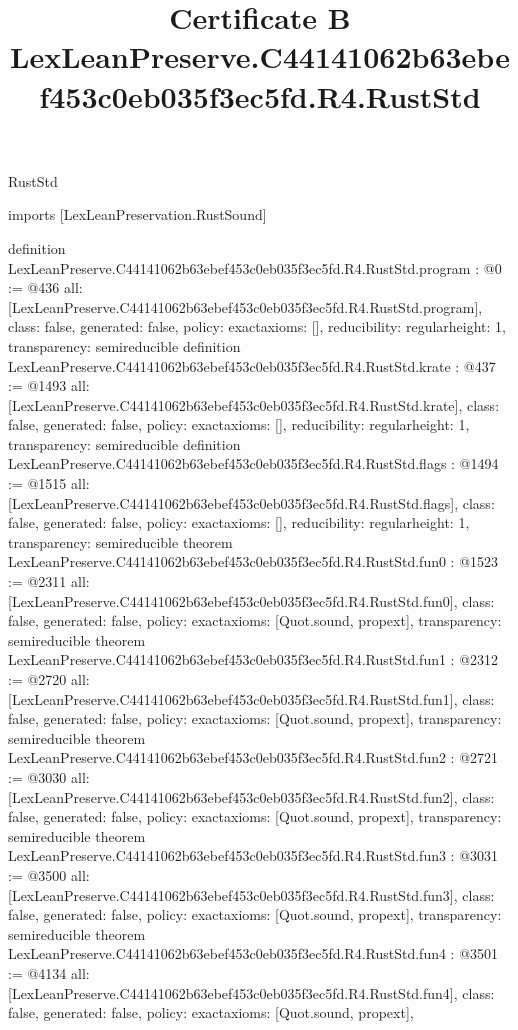 \begin{lexlean}{RustStd}
\title{Certificate B LexLeanPreserve.C44141062b63ebef453c0eb035f3ec5fd.R4.RustStd}
\begin{coremodule}
imports [LexLeanPreservation.RustSound]

definition LexLeanPreserve.C44141062b63ebef453c0eb035f3ec5fd.R4.RustStd.program : @0 := @436 {
  all: [LexLeanPreserve.C44141062b63ebef453c0eb035f3ec5fd.R4.RustStd.program],
  class: false,
  generated: false,
  policy: exact{axioms: []},
  reducibility: regular{height: 1},
  transparency: semireducible
}
definition LexLeanPreserve.C44141062b63ebef453c0eb035f3ec5fd.R4.RustStd.krate : @437 := @1493 {
  all: [LexLeanPreserve.C44141062b63ebef453c0eb035f3ec5fd.R4.RustStd.krate],
  class: false,
  generated: false,
  policy: exact{axioms: []},
  reducibility: regular{height: 1},
  transparency: semireducible
}
definition LexLeanPreserve.C44141062b63ebef453c0eb035f3ec5fd.R4.RustStd.flags : @1494 := @1515 {
  all: [LexLeanPreserve.C44141062b63ebef453c0eb035f3ec5fd.R4.RustStd.flags],
  class: false,
  generated: false,
  policy: exact{axioms: []},
  reducibility: regular{height: 1},
  transparency: semireducible
}
theorem LexLeanPreserve.C44141062b63ebef453c0eb035f3ec5fd.R4.RustStd.fun0 : @1523 := @2311 {
  all: [LexLeanPreserve.C44141062b63ebef453c0eb035f3ec5fd.R4.RustStd.fun0],
  class: false,
  generated: false,
  policy: exact{axioms: [Quot.sound, propext]},
  transparency: semireducible
}
theorem LexLeanPreserve.C44141062b63ebef453c0eb035f3ec5fd.R4.RustStd.fun1 : @2312 := @2720 {
  all: [LexLeanPreserve.C44141062b63ebef453c0eb035f3ec5fd.R4.RustStd.fun1],
  class: false,
  generated: false,
  policy: exact{axioms: [Quot.sound, propext]},
  transparency: semireducible
}
theorem LexLeanPreserve.C44141062b63ebef453c0eb035f3ec5fd.R4.RustStd.fun2 : @2721 := @3030 {
  all: [LexLeanPreserve.C44141062b63ebef453c0eb035f3ec5fd.R4.RustStd.fun2],
  class: false,
  generated: false,
  policy: exact{axioms: [Quot.sound, propext]},
  transparency: semireducible
}
theorem LexLeanPreserve.C44141062b63ebef453c0eb035f3ec5fd.R4.RustStd.fun3 : @3031 := @3500 {
  all: [LexLeanPreserve.C44141062b63ebef453c0eb035f3ec5fd.R4.RustStd.fun3],
  class: false,
  generated: false,
  policy: exact{axioms: [Quot.sound, propext]},
  transparency: semireducible
}
theorem LexLeanPreserve.C44141062b63ebef453c0eb035f3ec5fd.R4.RustStd.fun4 : @3501 := @4134 {
  all: [LexLeanPreserve.C44141062b63ebef453c0eb035f3ec5fd.R4.RustStd.fun4],
  class: false,
  generated: false,
  policy: exact{axioms: [Quot.sound, propext]},
}
\end{coremodule}
\end{lexlean}
